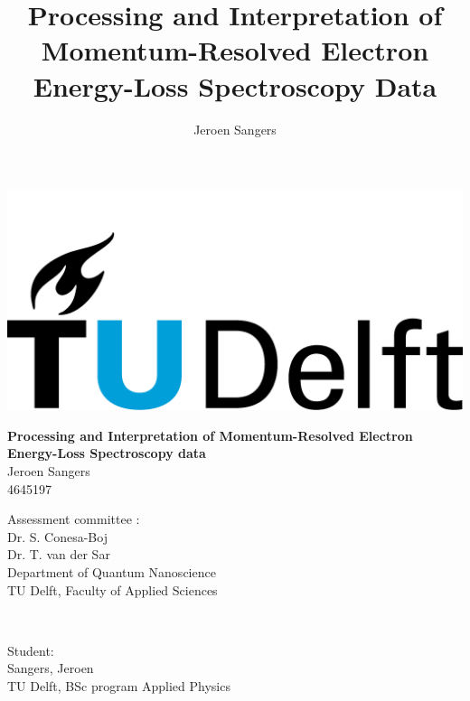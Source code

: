\begin{titlepage}

\title{ \huge \bfseries Processing and Interpretation of Momentum-Resolved Electron Energy-Loss Spectroscopy Data  }
\author{Jeroen Sangers}

\maketitle

\thispagestyle{empty}

\vspace{10cm}

\begin{center}
    \includegraphics[width=0.4\linewidth,keepaspectratio]{Resources/Figures/titlepage/TUD.png}
\end{center}

\afterpage{\blankpage}

\end{titlepage}

\newpage

\begin{center}




 { \huge \bfseries Processing and Interpretation of Momentum-Resolved
 Electron Energy-Loss Spectroscopy data  }\\[3cm]

 { Jeroen Sangers}\\
 { 4645197}\\

\vfill
\begin{minipage}{0.45\linewidth}
    \begin{flushleft}
        Assessment committee :\\
        Dr. S. Conesa-Boj\\
        Dr. T. van der Sar\\
        Department of Quantum Nanoscience\\
        TU Delft, Faculty of Applied Sciences
    \end{flushleft}
\end{minipage}
~
\begin{minipage}{0.45\linewidth}
    \begin{flushleft}
        Student:\\
        Sangers, Jeroen\\
        TU Delft, BSc program Applied Physics \\
    \end{flushleft}
\end{minipage}\\[1.5cm]

\end{center}
